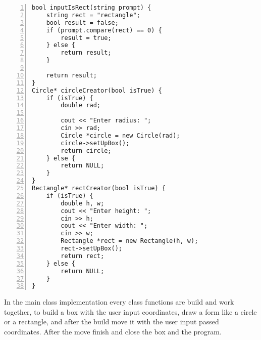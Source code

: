 \documentclass{article}
\begin{document}
\begin{lstlisting}[basicstyle=\footnotesize\ttfamily, numbers=left, stepnumber=1, numberstyle = \normalsize]
bool inputIsRect(string prompt) {
	string rect = "rectangle";
	bool result = false;
	if (prompt.compare(rect) == 0) {
		result = true; 
	} else {
		return result;
	}

	return result;
}
Circle* circleCreator(bool isTrue) {
	if (isTrue) {
		double rad;

		cout << "Enter radius: ";
		cin >> rad;
		Circle *circle = new Circle(rad);
		circle->setUpBox();
		return circle;
	} else {
		return NULL; 
	}
}
Rectangle* rectCreator(bool isTrue) {
	if (isTrue) {
		double h, w;
		cout << "Enter height: ";
		cin >> h;
		cout << "Enter width: ";
		cin >> w;
		Rectangle *rect = new Rectangle(h, w);
		rect->setUpBox();
		return rect; 
	} else {
		return NULL;
	}
}
\end{lstlisting}
\normalsize{
In the main class implementation every class functions are build and work together, to build a box with the user input coordinates, draw a form like a circle or a rectangle, and after the build move it with the user input passed coordinates. After the move finish and close the box and the program.\newline 
}









\end{document}
